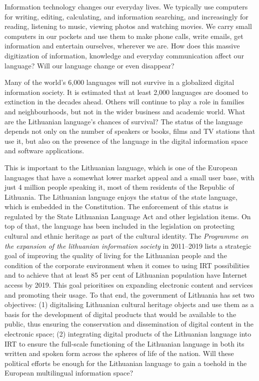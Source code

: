 \begin{multicols}{2}
Information technology changes our everyday lives. We typically use computers for writing, editing, calculating, and information searching, and increasingly for reading, listening to music, viewing photos and watching movies. We carry small computers in our pockets and use them to make phone calls, write emails, get information and entertain ourselves, wherever we are. How does this massive digitization of information, knowledge and everyday communication affect our language? Will our language change or even disappear?

Many of the world’s 6,000 languages will not survive in a globalized digital information society. It is estimated that at least 2,000 languages are doomed to extinction in the decades ahead. Others will continue to play a role in families and neighbourhoods, but not in the wider business and academic world. What are the Lithuanian language’s chances of survival? The status of the language depends not only on the number of speakers or books, films and TV stations that use it, but also on the presence of the language in the digital information space and software applications.

This is important to the Lithuanian language, which is one of the European languages that have a somewhat lower market appeal and a small user base, with just 4 million people speaking it, most of them residents of the Republic of Lithuania. The Lithuanian language enjoys the status of the state language, which is embedded in the Constitution. The enforcement of this status is regulated by the State Lithuanian Language Act and other legislation items. On top of that, the language has been included in the legislation on protecting cultural and ethnic heritage as part of the cultural identity. The \textit{Programme on the expansion of the lithuanian information society} in 2011–2019 lists a strategic goal of improving the quality of living for the Lithuanian people and the condition of the corporate environment when it comes to using IRT possibilities and to achieve that at least 85 per cent of Lithuanian population have Internet access by 2019. This goal prioritises on expanding electronic content and services and promoting their usage. To that end, the government of Lithuania has set two objectives: (1) digitalising Lithuanian cultural heritage objects and use them as a basis for the development of digital products that would be available to the public, thus ensuring the conservation and dissemination of digital content in the electronic space; (2) integrating digital products of the Lithuanian language into IRT to ensure the full-scale functioning of the Lithuanian language in both its written and spoken form across the spheres of life of the nation. Will these political efforts be enough for the Lithuanian language to gain a toehold in the European multilingual information space?


\end{multicols}

